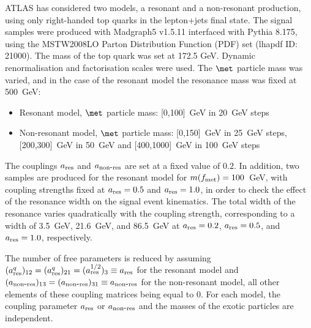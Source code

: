 
ATLAS has considered two models, a resonant and a non-resonant production, using only right-handed top quarks in the lepton+jets final state. 
The signal samples were produced with {\sc Madgraph5} v1.5.11 interfaced with {\sc Pythia} 8.175, using the MSTW2008LO Parton Distribution Function (PDF) set (lhapdf ID: 21000).
The mass of the top quark was set at 172.5 GeV. Dynamic renormalisation and factorisation scales were used.
The $\met$ particle mass was varied, and in the case of the resonant model the resonance mass was fixed at 500~GeV:
\begin{itemize}
\item Resonant model,  $\met$ particle mass: [0,100]~GeV in 20~GeV steps
\item Non-resonant model, $\met$ particle mass: [0,150]~GeV in 25~GeV steps, [200,300]~GeV in 50~GeV and [400,1000]~GeV in 100~GeV steps 
\end{itemize}

The couplings $a_{\mathrm{res}}$ and $a_{\mathrm{non\mbox{-}res}}$ are set at a fixed value of $0.2$.
In addition, two samples are produced for the resonant model for $m(f_{\mathrm{met}})=100$~GeV,
with coupling strengths fixed at $a_{\mathrm{res}}=0.5$ and $a_{\mathrm{res}}=1.0$,
in order to check the effect of the resonance width on the signal event kinematics. 
The total width of the resonance varies quadratically with the coupling strength,
corresponding to a width of 3.5~GeV, 21.6~GeV, and 86.5~GeV at $a_{\mathrm{res}}=0.2$, $a_{\mathrm{res}}=0.5$, and $a_{\mathrm{res}}=1.0$, respectively.

The number of free parameters is reduced by assuming $(a_{\mathrm{res}}^q)_{\mathrm{12}}=(a_{\mathrm{res}}^q)_{\mathrm{21}}=(a_{\mathrm{res}}^{1/2})_{\mathrm{3}}\equiv a_{\mathrm{res}}$
for the resonant model and $(a_{\mathrm{non\mbox{-}res}})_{\mathrm{13}}=(a_{\mathrm{non\mbox{-}res}})_{\mathrm{31}}\equiv a_{\mathrm{non\mbox{-}res}}$ for the non-resonant model,
all other elements of these coupling matrices being equal to 0.
For each model, the coupling parameter $a_{\mathrm{res}}$ or $a_{\mathrm{non\mbox{-}res}}$ and the masses of the exotic particles are independent.

